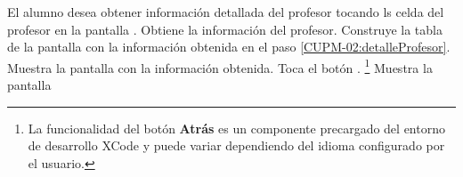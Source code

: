  \begin{UCtrayectoria}
    \UCpaso[\UCactor] El alumno desea obtener información detallada del profesor tocando ls celda del profesor en la pantalla .
    \UCpaso[\UCsist] Obtiene la información del profesor. \label{CUPM-02:detalleProfesor}
    \UCpaso[\UCsist] Construye la tabla de la pantalla  con la información obtenida en el paso \ref{CUPM-02:detalleProfesor}.
    \UCpaso[\UCsist] Muestra la pantalla  con la información obtenida.
    \UCpaso[\UCactor] Toca el botón . \footnote{La funcionalidad del botón \textbf{Atrás} es un componente precargado del entorno de desarrollo XCode y puede variar dependiendo del idioma configurado por el usuario.}
    \UCpaso[\UCsist] Muestra la pantalla 
 \end{UCtrayectoria}


 
%
%
 